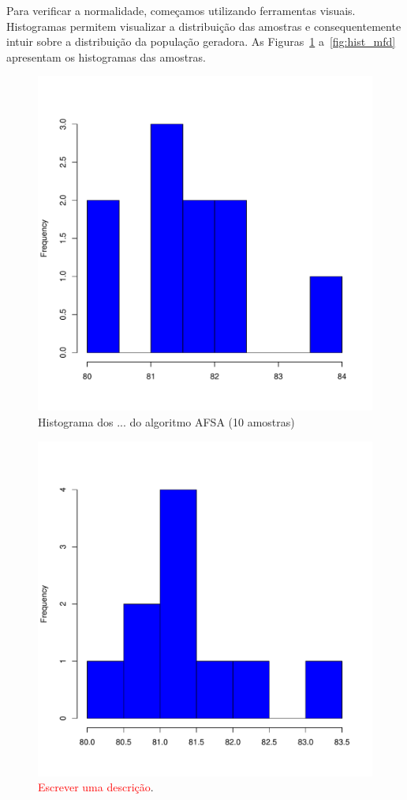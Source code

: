 \documentclass[conference]{IEEEtran}
\begin{document}
Para verificar a normalidade, começamos utilizando ferramentas visuais.
Histogramas permitem visualizar a distribuição das amostras e consequentemente intuir sobre a distribuição da população geradora.
As Figuras~\ref{fig:hist_afsa_cmfdr} a~\ref{fig:hist_mfd} apresentam os histogramas das amostras.

\begin{figure}[h]
	\centering
	\includegraphics[width=\linewidth]{img/bluehist_afsa_cmfdr.pdf}
	\caption{Histograma dos ... do algoritmo AFSA (10 amostras)}
	\label{fig:hist_afsa_cmfdr}
\end{figure}

\begin{figure}[h]
	\centering
	\includegraphics[width=\linewidth]{img/bluehist_cmfdr.pdf}
	\caption{\textcolor{red}{Escrever uma descrição}.}
	\label{fig:hist_cmfdr}
\end{figure}
\end{document}
